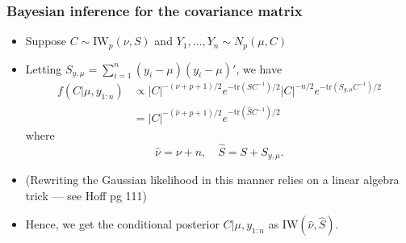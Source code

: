 \documentclass[handout]{beamer}
\begin{document}
\begin{frame}
\frametitle{Bayesian inference for the covariance matrix}
\begin{itemize}[<+-| alert@+>]
    \item Suppose $C \sim \mbox{IW}_p(\nu,S)$ and $Y_1,\ldots,Y_n\sim N_p(\mu,C)$
    \item Letting $S_{y,\mu} =\sum_{i=1}^n (y_i - \mu)(y_i - \mu)'$, we have
\begin{align*}
f(C|\mu,y_{1:n}) & \propto |C|^{-(\nu+p+1)/2} e^{ -\mbox{tr}( S C^{-1})/2 } 
                      |C|^{-n/2} e^{ -\mbox{tr}( S_{y,\mu} C^{-1} )/2 } \\
                      & = |C|^{-(\hat{\nu}+p+1)/2} e^{-\mbox{tr}(\hat{S} C^{-1})/2}
\end{align*}
where 
$$\hat{\nu} = \nu + n,\quad \hat{S} = S + S_{y,\mu}.$$

\item (Rewriting the Gaussian likelihood in this manner relies on a linear algebra trick --- see Hoff pg 111)

\item Hence, we get the conditional posterior $C|\mu,y_{1:n}$ as $\mbox{IW}( \hat{\nu}, \hat{S} )$. 
\end{itemize}
\end{frame}


\end{document}
